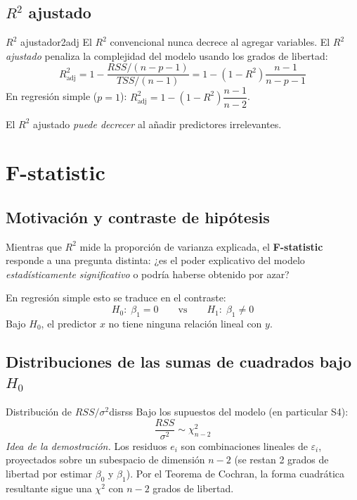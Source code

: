\documentclass[12pt, a4paper]{article}
\begin{document}
\subsection{$R^2$ ajustado}

\begin{definicion}{$R^2$ ajustado}{r2adj}
El $R^2$ convencional nunca decrece al agregar variables. El \emph{$R^2$
ajustado} penaliza la complejidad del modelo usando los grados de libertad:
\[
  R^2_{\text{adj}}
    = 1 - \frac{RSS/(n-p-1)}{TSS/(n-1)}
    = 1 - (1-R^2)\frac{n-1}{n-p-1}
\]
En regresión simple ($p=1$): $R^2_{\text{adj}} = 1-(1-R^2)\dfrac{n-1}{n-2}$.

El $R^2$ ajustado \emph{puede decrecer} al añadir predictores irrelevantes.
\end{definicion}


\section{F-statistic}

\subsection{Motivación y contraste de hipótesis}

Mientras que $R^2$ mide la proporción de varianza explicada, el
\textbf{F-statistic} responde a una pregunta distinta: ¿es el poder explicativo
del modelo \emph{estadísticamente significativo} o podría haberse obtenido
por azar?

En regresión simple esto se traduce en el contraste:
\[
  H_0:\; \beta_1 = 0
  \qquad \text{vs} \qquad
  H_1:\; \beta_1 \neq 0
\]
Bajo $H_0$, el predictor $x$ no tiene ninguna relación lineal con $y$.

\subsection{Distribuciones de las sumas de cuadrados bajo $H_0$}

\begin{proposicion}{Distribución de $RSS/\sigma^2$}{disrss}
Bajo los supuestos del modelo (en particular S4):
\[
  \frac{RSS}{\sigma^2} \sim \chi^2_{n-2}
\]
\textit{Idea de la demostración.} Los residuos $e_i$ son combinaciones
lineales de $\varepsilon_i$, proyectados sobre un subespacio de dimensión
$n-2$ (se restan 2 grados de libertad por estimar $\beta_0$ y $\beta_1$). Por
el Teorema de Cochran, la forma cuadrática resultante sigue una $\chi^2$
con $n-2$ grados de libertad.
\end{proposicion}
\end{document}
